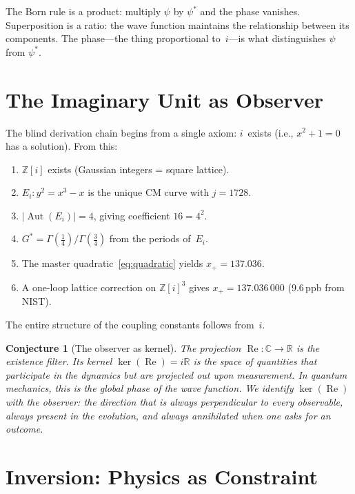 \documentclass[12pt,reqno]{amsart}
\newtheorem{conjecture}[theorem]{Conjecture}
\theoremstyle{definition}
\theoremstyle{remark}
\newcommand{\ZZ}{\mathbb{Z}}
\newcommand{\RR}{\mathbb{R}}
\newcommand{\CC}{\mathbb{C}}
\newcommand{\Gstar}{G^{\!*}}
\newcommand{\abs}[1]{\lvert #1 \rvert}
\newcommand{\Aut}{\operatorname{Aut}}
\newcommand{\re}{\operatorname{Re}}
\begin{document}
The Born rule is a product: multiply $\psi$ by $\psi^*$ and the phase vanishes.
Superposition is a ratio: the wave function maintains the relationship between its
components. The phase---the thing proportional to~$i$---is what distinguishes
$\psi$ from $\psi^*$.

\section{The Imaginary Unit as Observer}

The blind derivation chain \cite{Anon2026b} begins from a single axiom:
$i$~exists (i.e., $x^2+1=0$ has a solution). From this:
\begin{enumerate}[nosep]
  \item $\ZZ[i]$ exists (Gaussian integers = square lattice).
  \item $E_i\colon y^2=x^3-x$ is the unique CM curve with $j=1728$.
  \item $\abs{\Aut(E_i)}=4$, giving coefficient $16=4^2$.
  \item $\Gstar=\Gamma(\tfrac14)/\Gamma(\tfrac34)$ from the periods of~$E_i$.
  \item The master quadratic~\eqref{eq:quadratic} yields $x_+=137.036$.
  \item A one-loop lattice correction on $\ZZ[i]^3$ gives $x_+=137.036\,000$
        (9.6\,ppb from NIST).
\end{enumerate}
The entire structure of the coupling constants follows from~$i$.

\begin{conjecture}[The observer as kernel]\label{conj:observer}
The projection $\re\colon\CC\to\RR$ is the existence filter. Its kernel
$\ker(\re)=i\RR$ is the space of quantities that participate in the dynamics
but are projected out upon measurement. In quantum mechanics, this is the
global phase of the wave function. We identify $\ker(\re)$ with the observer:
the direction that is always perpendicular to every observable, always present
in the evolution, and always annihilated when one asks for an outcome.
\end{conjecture}

\section{Inversion: Physics as Constraint}
\end{document}
